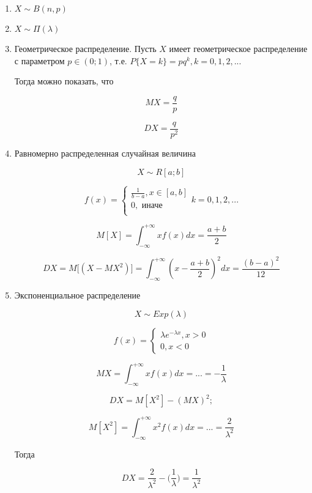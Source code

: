 \documentclass[a4paper, 14pt]{report}
\begin{document}
\begin{enumerate}
    \item $X \sim B(n,p)$
    \item $X \sim \Pi(\lambda)$
    \item Геометрическое распределение. Пусть $X$ имеет геометрическое распределение с параметром $p \in (0;1)$, т.е. $P\{ X = k \} = pq^k, k = 0,1,2,...$

        Тогда можно показать, что

        $$
        MX = \frac{q}{p}
        $$

        $$
        DX = \frac{q}{p^2}
        $$

    \item Равномерно распределенная случайная величина

        $$
        X \sim R[a;b]
        $$

        $$
        f(x) =
        \begin{cases}
            \frac{1}{b-a}, x \in [a,b] \\
            0, \text{ иначе} \\
        \end{cases}
        k = 0,1,2,...
        $$

        $$
        M[X] = \int_{-\infty}^{+\infty} xf(x)dx = \frac{a+b}{2}
        $$

        $$
        DX = M \bigg[ (X -MX^2) \bigg] = \int_{-\infty}^{+\infty} (x - \frac{a+b}{2})^2 dx = \frac{(b-a)^2}{12}
        $$

    \item Экспоненциальное распределение

        $$
        X \sim Exp(\lambda)
        $$

        $$
        f(x) =
        \begin{cases}
            \lambda e^{-\lambda x}, x > 0 \\
            0, x < 0
        \end{cases}
        $$

        $$
        MX = \int_{-\infty}^{+\infty} xf(x)dx = ... = -\frac{1}{\lambda}
        $$

        $$
        DX = M[X^2] - (MX)^2;
        $$

        $$
        M[X^2] = \int_{-\infty}^{+\infty} x^2 f(x) dx = ... = \frac{2}{\lambda^2}
        $$

        Тогда

        $$
        DX = \frac{2}{\lambda^2} - \bigg( \frac{1}{\lambda} \bigg) = \frac{1}{\lambda^2}
        $$


\end{enumerate}
\end{document}
